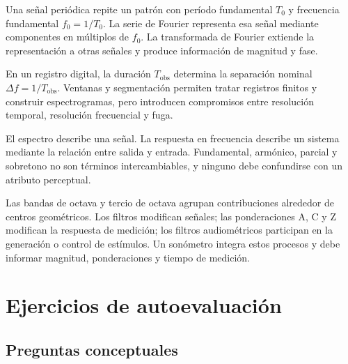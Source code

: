 Una señal periódica repite un patrón con período fundamental \(T_0\) y
frecuencia fundamental \(f_0=1/T_0\). La serie de Fourier representa esa señal
mediante componentes en múltiplos de \(f_0\). La transformada de Fourier
extiende la representación a otras señales y produce información de magnitud
y fase.

En un registro digital, la duración \(T_\mathrm{obs}\) determina la separación
nominal \(\Delta f=1/T_\mathrm{obs}\). Ventanas y segmentación permiten tratar
registros finitos y construir espectrogramas, pero introducen compromisos
entre resolución temporal, resolución frecuencial y fuga.

El espectro describe una señal. La respuesta en frecuencia describe un sistema
mediante la relación entre salida y entrada. Fundamental, armónico, parcial y
sobretono no son términos intercambiables, y ninguno debe confundirse con un
atributo perceptual.

Las bandas de octava y tercio de octava agrupan contribuciones alrededor de
centros geométricos. Los filtros modifican señales; las ponderaciones A, C y Z
modifican la respuesta de medición; los filtros audiométricos participan en la
generación o control de estímulos. Un sonómetro integra estos procesos y debe
informar magnitud, ponderaciones y tiempo de medición.

\section{Ejercicios de autoevaluación}
\label{sec:u5-ejercicios}

\subsection*{Preguntas conceptuales}

